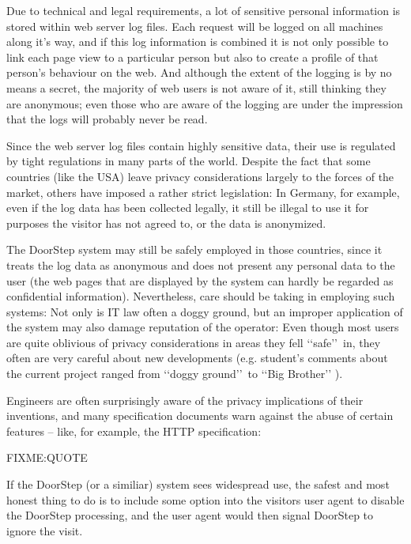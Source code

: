 \documentclass[a4paper]{danarticle}
\theoremstyle{remark}
\begin{document}
    Due to technical and legal requirements, a lot of sensitive personal 
    information is stored within web server log files. Each request will be 
    logged on all machines along it's way, and if this log information is 
    combined it is not only possible to link each page view to a particular 
    person but also to create a profile of that person's behaviour on the web. 
    And although the extent of the logging is by no means a secret, the majority 
    of web users is not aware of it, still thinking they are anonymous; even 
    those who are aware of the logging are under the impression that the logs 
    will probably never be read.
    
    Since the web server log files contain highly sensitive data, their use is 
    regulated by tight regulations in many parts of the world. Despite the fact 
    that some countries (like the USA) leave privacy considerations largely to 
    the forces of the market, others have imposed a rather strict legislation: 
    In Germany, for example, even if the log data has been collected legally, it 
    still be illegal to use it for purposes the visitor has not agreed to, or 
    the data is anonymized.
    
    The DoorStep system may still be safely employed in those countries, since 
    it treats the log data as anonymous and does not present any personal data 
    to the user (the web pages that are displayed by the system can hardly be 
    regarded as confidential information). Nevertheless, care should be taking 
    in employing such systems: Not only is IT law often a doggy ground, but an 
    improper application of the system may also damage reputation of the 
    operator: Even though most users are quite oblivious of privacy 
    considerations in areas they fell \lq\lq safe\rq\rq\ in, they often are very 
    careful about new developments (e.g. student's comments about the current 
    project ranged from \lq\lq doggy ground\rq\rq\ to \lq\lq Big Brother\rq\rq 
    ).
    
    Engineers are often surprisingly aware of the privacy implications of their 
    inventions, and many specification documents warn against the abuse of 
    certain features -- like, for example, the HTTP specification\cite{http}:
    
    FIXME:QUOTE
    
    If the DoorStep (or a similiar) system sees widespread use, the safest and 
    most honest thing to do is to include some option into the visitors user 
    agent to disable the DoorStep processing, and the user agent would then 
    signal DoorStep to ignore the visit.
\end{document}
